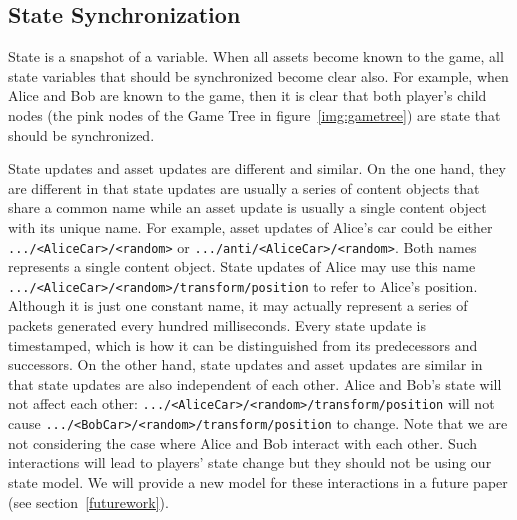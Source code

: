 \documentclass{article}
\begin{document}
\subsection{State Synchronization}
\label{statesynchronization}

State is a snapshot of a variable. When all assets become known to the game, all state variables that should be synchronized become clear also. For example, when Alice and Bob are known to the game, then it is clear that both player's child nodes (the pink nodes of the Game Tree in figure~\ref{img:gametree}) are state that should be synchronized. 

State updates and asset updates are different and similar. On the one hand, they are different in that state updates are usually a series of content objects that share a common name while an asset update is usually a single content object with its unique name. For example, asset updates of Alice's car could be either \texttt{.../<AliceCar>/<random>} or \texttt{.../anti/<AliceCar>/<random>}. Both names represents a single content object. State updates of Alice may use this name \texttt{.../<AliceCar>/<random>/transform/position} to refer to Alice's position. Although it is just one constant name, it may actually represent a series of packets generated every hundred milliseconds. Every state update is timestamped, which is how it can be distinguished from its predecessors and successors. On the other hand, state updates and asset updates are similar in that state updates are also independent of each other. Alice and Bob's state will not affect each other: \texttt{.../<AliceCar>/<random>/transform/position} will not cause \texttt{.../<BobCar>/<random>/transform/position} to change. Note that we are not considering the case where Alice and Bob interact with each other. Such interactions will lead to players' state change but they should not be using our state model. We will provide a new model for these interactions in a future paper (see section~\ref{futurework}).
\end{document}
